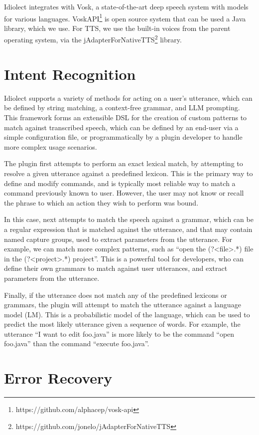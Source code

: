 \documentclass[conference]{IEEEtran}
\begin{document}
Idiolect integrates with Vosk, a state-of-the-art deep speech system with models for various languages. VoskAPI\footnote{https://github.com/alphacep/vosk-api} is open source system that can be used a Java library, which we use. For TTS, we use the built-in voices from the parent operating system, via the jAdapterForNativeTTS\footnote{https://github.com/jonelo/jAdapterForNativeTTS} library.

\section{Intent Recognition}

Idiolect supports a variety of methods for acting on a user's utterance, which can be defined by string matching, a context-free grammar, and LLM prompting. This framework forms an extensible DSL for the creation of custom patterns to match against transcribed speech, which can be defined by an end-user via a simple configuration file, or programmatically by a plugin developer to handle more complex usage scenarios.

The plugin first attempts to perform an exact lexical match, by attempting to resolve a given utterance against a predefined lexicon. This is the primary way to define and modify commands, and is typically most reliable way to match a command previously known to user. However, the user may not know or recall the phrase to which an action they wish to perform was bound.

In this case, next attempts to match the speech against a grammar, which can be a regular expression that is matched against the utterance, and that may contain named capture groups, used to extract parameters from the utterance. For example, we can match more complex patterns, such as ``open the (?<file>.*) file in the (?<project>.*) project''. This is a powerful tool for developers, who can define their own grammars to match against user utterances, and extract parameters from the utterance.

Finally, if the utterance does not match any of the predefined lexicons or grammars, the plugin will attempt to match the utterance against a language model (LM). This is a probabilistic model of the language, which can be used to predict the most likely utterance given a sequence of words. For example, the utterance ``I want to edit foo.java'' is more likely to be the command ``open foo.java'' than the command ``execute foo.java''.

\section{Error Recovery}
\end{document}
